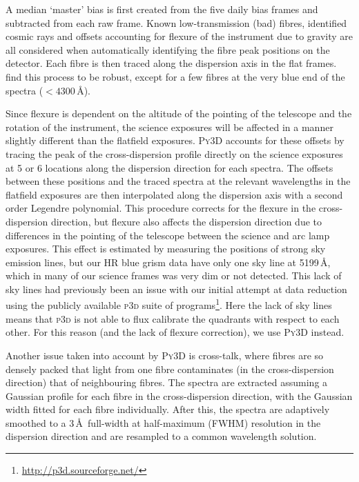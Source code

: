 		A median `master' bias is first created from the five daily bias frames and subtracted from each raw frame. Known low-transmission (bad) fibres, identified cosmic rays and offsets accounting for flexure of the instrument due to gravity are all considered when automatically identifying the fibre peak positions on the detector. Each fibre is then traced along the dispersion axis in the flat frames. \citet{Husemann2014} find this process to be robust, except for a few fibres at the very blue end of the spectra ($<4300$\,\AA). 

		Since flexure is dependent on the altitude of the pointing of the telescope and the rotation of the instrument, the science exposures will be affected in a manner slightly different than the flatfield exposures. \textsc{Py3D} accounts for these offsets by tracing the peak of the cross-dispersion profile directly on the science exposures at 5 or 6 locations along the dispersion direction for each spectra. The offsets between these positions and the traced spectra at the relevant wavelengths in the flatfield exposures are then interpolated along the dispersion axis with a second order Legendre polynomial. This procedure corrects for the flexure in the cross-dispersion direction, but flexure also affects the dispersion direction due to differences in the pointing of the telescope between the science and arc lamp exposures. This effect is estimated by measuring the positions of strong sky emission lines, but our HR blue grism data have only one sky line at 5199\,\AA, which in many of our science frames was very dim or not detected. This lack of sky lines had previously been an issue with our initial attempt at data reduction using the publicly available \textsc{p3d} suite of programs\footnote{\url{http://p3d.sourceforge.net/}}. Here the lack of sky lines means that \textsc{p3d} is not able to flux calibrate the quadrants with respect to each other. For this reason (and the lack of flexure correction), we use \textsc{Py3D} instead.

		Another issue taken into account by \textsc{Py3D} is cross-talk, where fibres are so densely packed that light from one fibre contaminates (in the cross-dispersion direction) that of neighbouring fibres. The spectra are extracted assuming a Gaussian profile for each fibre in the cross-dispersion direction, with the Gaussian width fitted for each fibre individually. After this, the spectra are adaptively smoothed to a 3\,\AA\ full-width at half-maximum (FWHM) resolution in the dispersion direction and are resampled to a common wavelength solution.

